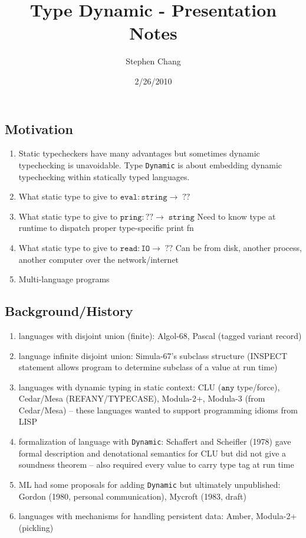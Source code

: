 \documentclass[12pt]{article}	%
\begin{document}
\newcommand{\Dynamic}{\texttt{Dynamic}\xspace}
\newcommand{\typecase}{\texttt{typecase}\xspace}
\newcommand{\dynamic}{\texttt{dynamic}\xspace}
\newcommand{\wrong}{\texttt{wrong}\xspace}
\newcommand{\deno}[1]{ \ensuremath{[\![#1]\!]} }
\newcommand{\code}[1]{$\mathtt{#1}$}


\title{Type Dynamic - Presentation Notes}
\author{Stephen Chang}
\date{2/26/2010}
\maketitle

\subsection*{Motivation}
\begin{enumerate}
	\item Static typecheckers have many advantages but sometimes dynamic typechecking is unavoidable. Type \Dynamic is about embedding dynamic typechecking within statically typed languages.
	\item What static type to give to \code{eval:string\rightarrow\;??}
	\item What static type to give to \code{pring:??\rightarrow\;string}
	      Need to know type at runtime to dispatch proper type-specific print fn
	\item What static type to give to \code{read:IO\rightarrow\;??}
	      Can be from disk, another process, another computer over the network/internet
	\item Multi-language programs
\end{enumerate}

\subsection*{Background/History}
\begin{enumerate}
	\item languages with disjoint union (finite): Algol-68, Pascal (tagged variant record)
	\item language infinite disjoint union: Simula-67's subclass structure (INSPECT statement allows program to determine subclass of a value at run time)
	\item languages with dynamic typing in static context: CLU (\code{any} type/force), Cedar/Mesa (REFANY/TYPECASE), Modula-2+, Modula-3 (from Cedar/Mesa) -- these languages wanted to support programming idioms from LISP
	\item formalization of language with \Dynamic: Schaffert and Scheifler (1978) gave formal description and denotational semantics for CLU but did not give a soundness theorem -- also required every value to carry type tag at run time
	\item ML had some proposals for adding \Dynamic but ultimately unpublished: Gordon (1980, personal communication), Mycroft (1983, draft)
	\item languages with mechanisms for handling persistent data: Amber, Modula-2+ (pickling)
\end{enumerate}
\end{document}
